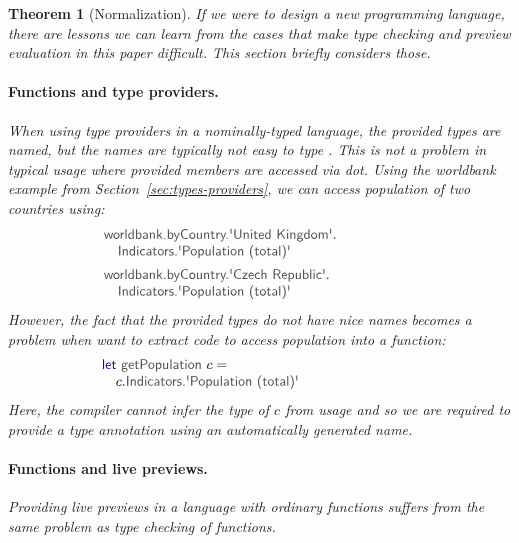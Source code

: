 \documentclass[acmsmall,anonymous,fleqn]{acmart}\settopmatter{printfolios=false,printccs=false,printacmref=false}
\newcounter{thc}
\theoremstyle{plain}
\newtheorem{theorem}[thc]{Theorem}
\theoremstyle{definition}
\newcommand{\ident}[1]{\textnormal{\textcolor{idclr}{\sffamily #1}}}
\newcommand{\kvd}[1]{\textnormal{\textcolor{kvdclr}{\sffamily #1}}}
\begin{document}
\begin{theorem}[Normalization]
If we were to design a new programming language, there are lessons we can learn from the
cases that make type checking and preview evaluation in this paper difficult. This section
briefly considers those.

\paragraph{Functions and type providers.} When using type providers in a nominally-typed language,
the provided types are named, but the names are typically not easy to type \cite{fsdata}. This is
not a problem in typical usage where provided members are accessed via dot. Using the \ident{worldbank}
example from Section~\ref{sec:types-providers}, we can access population of two countries using:
%
\begin{equation*}
\begin{array}{l}
\ident{worldbank.byCountry.\textquotesingle United Kingdom\textquotesingle}.\\
\quad \ident{Indicators.\textquotesingle Population (total)\textquotesingle}\\[0.5em]
\ident{worldbank.byCountry.\textquotesingle Czech Republic\textquotesingle}.\\
\quad \ident{Indicators.\textquotesingle Population (total)\textquotesingle}\hspace{9em}
\end{array}
\end{equation*}
%
However, the fact that the provided types do not have nice names becomes a problem when want to
extract code to access population into a function:
%
\begin{equation*}
\begin{array}{l}
\kvd{let}~\ident{getPopulation}~c=\\
\quad c.\ident{Indicators.\textquotesingle Population (total)\textquotesingle}\hspace{8.5em}
\end{array}
\end{equation*}
%
Here, the compiler cannot infer the type of $c$ from usage and so we are required to provide a
type annotation using an automatically generated name.

\paragraph{Functions and live previews.}
Providing live previews in a language with ordinary functions suffers from the same problem as
type checking of functions.


\end{theorem}
\end{document}
